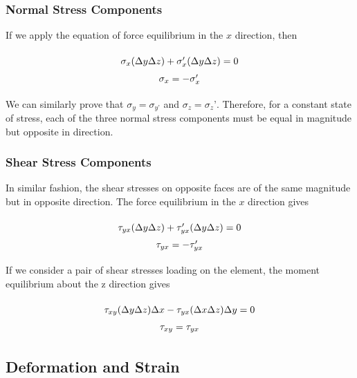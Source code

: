 \documentclass[
10pt,
a4paper,
openany,
svgnames,
]{book}
\begin{document}
\subsubsection{Normal Stress Components}

If we apply the equation of force equilibrium in the $x$ direction, then

\begin{equation}
  \arraycolsep=1.4pt\def\arraystretch{1.5}
  \begin{array}{c}
    \sigma _x(\Delta y\Delta z) + \sigma_x'(\Delta y\Delta z) = 0\\
    \sigma _x =  - \sigma_x'
  \end{array}
\end{equation}

We can similarly prove that $\sigma_y = \sigma_{y’}$ and $\sigma_z = \sigma_z’$. Therefore, for a constant state of stress, each of the three normal stress components must be equal in magnitude but opposite in direction.

\subsubsection{Shear Stress Components}

In similar fashion, the shear stresses on opposite faces are of the same magnitude but in opposite direction.
The force equilibrium in the $x$ direction gives

\begin{equation}
  \arraycolsep=1.4pt\def\arraystretch{1.5}
  \begin{array}{c}
    \tau _{yx}(\Delta y\Delta z) + \tau_{yx}'(\Delta y\Delta z) = 0\\
    \tau _{yx} =  - \tau_{yx}'
  \end{array}
\end{equation}

If we consider a pair of shear stresses loading on the element, the moment equilibrium about the z direction gives

\begin{equation}
  \arraycolsep=1.4pt\def\arraystretch{1.5}
  \begin{array}{c}
    \tau _{xy}(\Delta y\Delta z)\Delta x - \tau _{yx}(\Delta x\Delta z)\Delta y = 0\\
    \tau _{xy} = \tau _{yx}
  \end{array}
\end{equation}

\subsection{Deformation and Strain}
\end{document}
